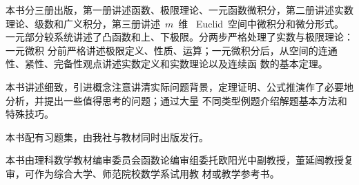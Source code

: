 

\begin{summary}
本书分三册出版，第一册讲述函数、极限理论、一元函数微积分，第二册讲述实数理论、级数和广义积分，第三册讲述~$m$~维
~Euclid~空间中微积分和微分形式。一元部分较系统讲述了凸函数和上、下极限。分两步严格处理了实数与极限理论：一元微积
分前严格讲述极限定义、性质、运算；一元微积分后，从空间的连通性、紧性、完备性观点讲述实数定义和实数理论以及连续函
数的基本定理。

本书讲述细致，引进概念注意讲清实际问题背景，定理证明、公式推演作了必要地分析，并提出一些值得思考的问题；通过大量
不同类型例题介绍解题基本方法和特殊技巧。

本书配有习题集，由我社与教材同时出版发行。

本书由理科数学教材编审委员会函数论编审组委托欧阳光中副教授，董延闿教授复审，可作为综合大学、师范院校数学系试用教
材或教学参考书。
\end{summary}

\MakeVolume*

\volfrontmatter



\VolumeTOC

\volmainmatter










\endinput
